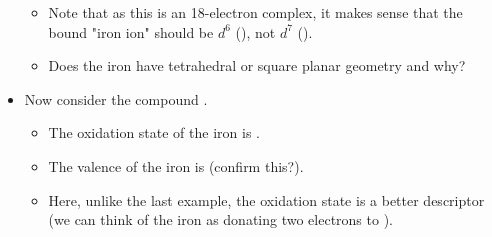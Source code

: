 \documentclass[../notes.tex]{subfiles}
\begin{document}
\begin{itemize}
\begin{itemize}
        \item Note that as this is an 18-electron complex, it makes sense that the bound "iron ion" should be $d^6$ (), not $d^7$ ().
        \item Does the iron have tetrahedral or square planar geometry and why?
    \end{itemize}
    \item Now consider the compound .
    \begin{itemize}
        \item The oxidation state of the iron is .
        \item The valence of the iron is  (confirm this?).
        \item Here, unlike the last example, the oxidation state is a better descriptor (we can think of the iron as donating two electrons to ).
    \end{itemize}
\end{itemize}
\end{document}
